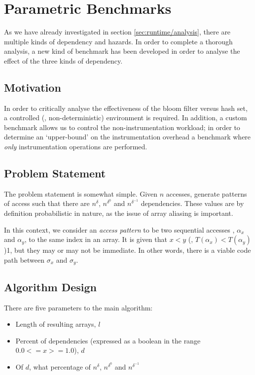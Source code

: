 \section{Parametric Benchmarks} \label{sec:methodology/params}
As we have already investigated in section \ref{sec:runtime/analysis}, there are multiple kinds of dependency and hazards. In order to complete a thorough analysis, a new kind of benchmark has been developed in order to analyse the effect of the three kinds of dependency.

	\subsection{Motivation} \label{sec:methodology/params/motivation}
	In order to critically analyse the effectiveness of the bloom filter versus hash set, a controlled (\ie, non-deterministic) environment is required. In addition, a custom benchmark allows us to control the non-instrumentation workload; in order to determine an `upper-bound' on the instrumentation overhead a benchmark where \emph{only} instrumentation operations are performed. 

	\subsection{Problem Statement} \label{sec:methodology/params/problem}
	The problem statement is somewhat simple. Given $n$ accesses, generate patterns of access such that there are $n^{\delta}$, $n^{\delta^{0}}$ and $n^{\delta^{-1}}$ dependencies. These values are by definition probabilistic in nature, as the issue of array aliasing is important.
	
	In this context, we consider an \textit{access pattern} to be two sequential accesses , $\alpha_x$ and $\alpha_y$, to the same index in an array. It is given that $x < y$ (\ie, $T(\alpha_x) < T(\alpha_y)$)1, but they may or may not be immediate. In other words, there is a viable code path between $\sigma_x$ and $\sigma_y$.
	
	\subsection{Algorithm Design} \label{sec:methodology/params/algo}
	There are five parameters to the main algorithm:
	
	\begin{itemize}
		\item Length of resulting arrays, $l$
		\item Percent of dependencies (expressed as a boolean in the range $0.0 <= x >= 1.0$), $d$
		\item Of $d$, what percentage of $n^{\delta}$, $n^{\delta^{0}}$ and $n^{\delta^{-1}}$
	\end{itemize}
	
